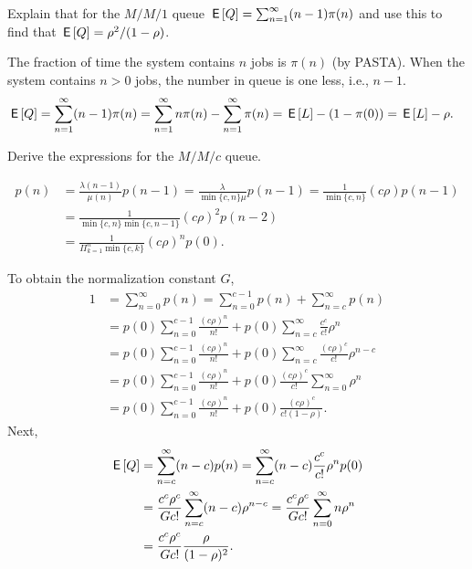 \begin{exercise}
 Explain that for the $M/M/1$ queue $\,\mathsf{E}\left[Q\right] = \sum_{n=1}^\infty (n-1)\pi(n)$ and use this to find that $\,\mathsf{E}\left[Q\right]=\rho^2/(1-\rho)$.
\begin{solution}
 The fraction of time the system contains $n$ jobs is $\pi(n)$ (by
 PASTA). When the system contains $n>0$ jobs, the number in queue
 is one less, i.e., $n-1$.
\begin{align*}
\,\mathsf{E}\left[Q\right] 
&= \sum_{n=1}^\infty (n-1)\pi(n) 
=\sum_{n=1}^\infty n\pi(n) -\sum_{n=1}^\infty \pi(n)
= \,\mathsf{E}\left[L\right] - (1-\pi(0)) = \,\mathsf{E}\left[L\right] - \rho.
\end{align*}
\end{solution}
\end{exercise}



\begin{exercise}\label{ex:7}
Derive the expressions for the  $M/M/c$ queue.
\begin{solution}
 \begin{align*}
 p(n) 
 &= \frac{\lambda(n-1)}{\mu(n)}p(n-1) 
 = \frac{\lambda}{\min\{c, n\} \mu }p(n-1) 
 = \frac{1}{\min\{c, n\}}(c\rho) p(n-1) \\
 & = \frac{1}{\min\{c, n\}\min\{c, n-1\}}(c\rho)^2 p(n-2) \\
 &= \frac{1}{\Pi_{k=1}^{n}\min\{c, k\}}(c\rho)^{n} p(0). 
 \end{align*}


To obtain the normalization constant $G$,
\begin{align*}
1 &= \sum_{n=0}^\infty p(n) 
= \sum_{n=0}^{c-1} p(n) + \sum_{n=c}^\infty p(n) \\
&=p(0) \sum_{n=0}^{c-1}\frac{(c\rho)^n}{n!} + 
 p(0)\sum_{n=c}^{\infty} \frac{c^c}{c!} \rho^{n} \\
&=p(0)\sum_{n=0}^{c-1}\frac{(c\rho)^n}{n!} + 
 p(0) \sum_{n=c}^{\infty} \frac{(c\rho)^c}{c!} \rho^{n-c} \\
&= 
p(0)\sum_{n=0}^{c-1}\frac{(c\rho)^n}{n!} + 
p(0)\frac{(c\rho)^c}{c!} \sum_{n=0}^{\infty} \rho^n \\
&= 
p(0) \sum_{n=0}^{c-1}\frac{(c\rho)^n}{n!} + 
p(0)\frac{(c\rho)^c}{c!(1-\rho)}.
\end{align*}
Next, 
\begin{align*}
 \,\mathsf{E}\left[Q\right] 
&=\sum_{n=c}^\infty (n-c) p(n) 
=\sum_{n=c}^\infty (n-c) \frac{c^c}{c!}\rho^{n} p(0) \\
&=\frac{c^c\rho^c}{G c!} \sum_{n=c}^\infty (n-c) \rho^{n-c} 
=\frac{c^c\rho^c}{G c!} \sum_{n=0}^\infty n \rho^n \\
&=\frac{c^c\rho^c}{G c!} \frac{\rho}{(1-\rho)^2}.
\end{align*}


\end{solution}
\end{exercise}
